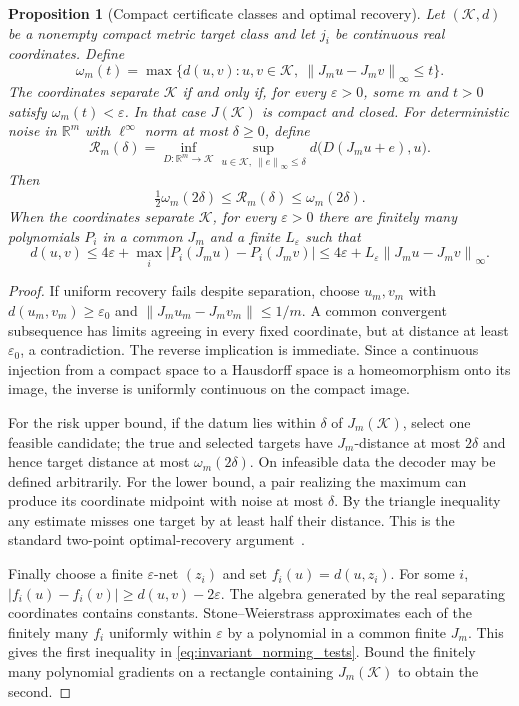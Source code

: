 \documentclass[11pt,a4paper]{amsart}
\numberwithin{equation}{section}
\newtheorem{proposition}[theorem]{Proposition}
\theoremstyle{definition}
\theoremstyle{remark}
\newcommand{\R}{\mathbb R}
\newcommand{\norm}[1]{\left\lVert#1\right\rVert}
\begin{document}
\begin{proposition}[Compact certificate classes and optimal recovery]\label{prop:invariant_compact}
Let $(\mathcal K,d)$ be a nonempty compact metric target class and let $j_i$ be continuous real coordinates. Define
\begin{equation}\label{eq:invariant_fibre_modulus}
 \omega_m(t)=\max\{d(u,v):u,v\in\mathcal K,\
                 \norm{J_mu-J_mv}_\infty\le t\}.
\end{equation}
The coordinates separate $\mathcal K$ if and only if, for every $\varepsilon>0$, some $m$ and $t>0$ satisfy $\omega_m(t)<\varepsilon$. In that case $J(\mathcal K)$ is compact and closed. For deterministic noise in $\R^m$ with $\ell^\infty$ norm at most $\delta\ge0$, define
\[
 \mathcal R_m(\delta)=\inf_{D:\R^m\to\mathcal K}
 \sup_{u\in\mathcal K,\ \norm e_\infty\le\delta}
 d\big(D(J_mu+e),u\big).
\]
Then
\begin{equation}\label{eq:invariant_compact_risk}
 \tfrac12\omega_m(2\delta)\le\mathcal R_m(\delta)\le\omega_m(2\delta).
\end{equation}
When the coordinates separate $\mathcal K$, for every $\varepsilon>0$ there are finitely many polynomials $P_i$ in a common $J_m$ and a finite $L_\varepsilon$ such that
\begin{equation}\label{eq:invariant_norming_tests}
 d(u,v)\le4\varepsilon+\max_i|P_i(J_mu)-P_i(J_mv)|
 \le4\varepsilon+L_\varepsilon\norm{J_mu-J_mv}_\infty.
\end{equation}
\end{proposition}
\begin{proof}
If uniform recovery fails despite separation, choose $u_m,v_m$ with $d(u_m,v_m)\ge\varepsilon_0$ and $\norm{J_mu_m-J_mv_m}\le1/m$. A common convergent subsequence has limits agreeing in every fixed coordinate, but at distance at least $\varepsilon_0$, a contradiction. The reverse implication is immediate. Since a continuous injection from a compact space to a Hausdorff space is a homeomorphism onto its image, the inverse is uniformly continuous on the compact image.

For the risk upper bound, if the datum lies within $\delta$ of $J_m(\mathcal K)$, select one feasible candidate; the true and selected targets have $J_m$-distance at most $2\delta$ and hence target distance at most $\omega_m(2\delta)$. On infeasible data the decoder may be defined arbitrarily. For the lower bound, a pair realizing the maximum can produce its coordinate midpoint with noise at most $\delta$. By the triangle inequality any estimate misses one target by at least half their distance. This is the standard two-point optimal-recovery argument~\cite{MR,EF}.

Finally choose a finite $\varepsilon$-net $(z_i)$ and set $f_i(u)=d(u,z_i)$. For some $i$, $|f_i(u)-f_i(v)|\ge d(u,v)-2\varepsilon$. The algebra generated by the real separating coordinates contains constants. Stone--Weierstrass approximates each of the finitely many $f_i$ uniformly within $\varepsilon$ by a polynomial in a common finite $J_m$. This gives the first inequality in \eqref{eq:invariant_norming_tests}. Bound the finitely many polynomial gradients on a rectangle containing $J_m(\mathcal K)$ to obtain the second.
\end{proof}
\end{document}
